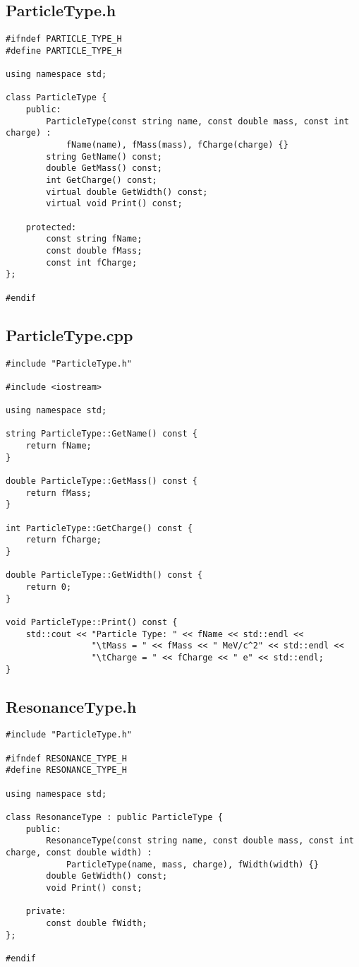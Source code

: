 \documentclass{article}
\begin{document}
\subsection*{ParticleType.h}
\begin{verbatim}
#ifndef PARTICLE_TYPE_H
#define PARTICLE_TYPE_H

using namespace std;

class ParticleType {
    public:
        ParticleType(const string name, const double mass, const int charge) :
            fName(name), fMass(mass), fCharge(charge) {}
        string GetName() const;
        double GetMass() const;
        int GetCharge() const;
        virtual double GetWidth() const;
        virtual void Print() const;

    protected:
        const string fName;
        const double fMass;
        const int fCharge;
};

#endif
\end{verbatim}

\subsection*{ParticleType.cpp}
\begin{verbatim}
#include "ParticleType.h"

#include <iostream>

using namespace std;

string ParticleType::GetName() const {
    return fName;
}

double ParticleType::GetMass() const {
    return fMass;
}

int ParticleType::GetCharge() const {
    return fCharge;
}

double ParticleType::GetWidth() const {
    return 0;
}

void ParticleType::Print() const {
    std::cout << "Particle Type: " << fName << std::endl <<
                 "\tMass = " << fMass << " MeV/c^2" << std::endl <<
                 "\tCharge = " << fCharge << " e" << std::endl;
}
\end{verbatim}

\subsection*{ResonanceType.h}
\begin{verbatim}
#include "ParticleType.h"

#ifndef RESONANCE_TYPE_H
#define RESONANCE_TYPE_H

using namespace std;

class ResonanceType : public ParticleType {
    public:
        ResonanceType(const string name, const double mass, const int charge, const double width) :
            ParticleType(name, mass, charge), fWidth(width) {}
        double GetWidth() const;
        void Print() const;
        
    private:
        const double fWidth;
};

#endif
\end{verbatim}
\end{document}
